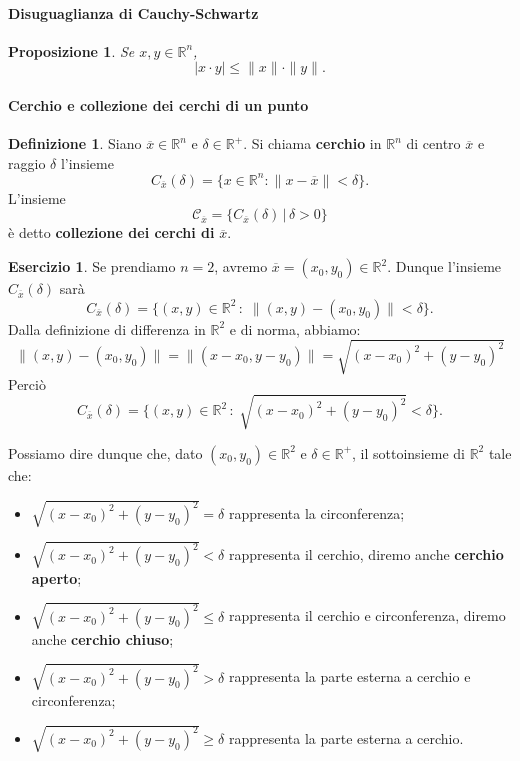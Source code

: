 \documentclass{article}
\theoremstyle{plain}
\newtheorem{prop}[thm]{Proposizione}
\theoremstyle{definition}
\newtheorem{defn}{Definizione}[section]
\newtheorem{xca}[exmp]{Esercizio}
\theoremstyle{remark}
\begin{document}
\vspace{10pt}

\paragraph{Disuguaglianza di Cauchy-Schwartz}
\begin{bxthm}
\begin{prop}
    Se $x,y\in\mathbb{R}^n$, \[|x\cdot y|\leq \|x\|\cdot\|y\|.\]
\end{prop}
\end{bxthm}

\vspace{10pt}


\paragraph{Cerchio e collezione dei cerchi di un punto}
\begin{bxthm}
\begin{defn}
    Siano $\overline{x}\in\mathbb{R}^n$ e $\delta\in\mathbb{R}^+$. 
    Si chiama \textbf{cerchio} in $\mathbb{R}^n$ di centro $\overline{x}$ e raggio $\delta$ l'insieme 
    \[C_{\overline{x}}(\delta)=\{x\in\mathbb{R}^n:\|x-\overline{x}\|<\delta\}.\]
    L'insieme \[\mathcal{C}_{\overline{x}}=\{C_{\overline{x}}(\delta) \,|\, \delta>0\}\] è detto \textbf{collezione dei cerchi di} $\overline{x}$.
\end{defn}
\end{bxthm}

\vspace{10pt}

\begin{xca}
    Se prendiamo $n=2$, avremo $\overline{x}=(x_0,y_0)\in\mathbb{R}^2$. 
    Dunque l'insieme $C_{\overline{x}}(\delta)$ sarà
    \[C_{\overline{x}}(\delta)=\{(x,y)\in\mathbb{R}^2\,:\;\|(x,y)-(x_0,y_0)\|<\delta\}.\]
    Dalla definizione di differenza in $\mathbb{R}^2$ e di norma, abbiamo:
    \[\|(x,y)-(x_0,y_0)\|=\|(x-x_0,y-y_0)\|=\sqrt{(x-x_0)^2+(y-y_0)^2}\]
    Perciò
    \[C_{\overline{x}}(\delta)=\{(x,y)\in\mathbb{R}^2\,:\;\sqrt{(x-x_0)^2+(y-y_0)^2}<\delta\}.\]

    Possiamo dire dunque che, dato $(x_0,y_0)\in\mathbb{R}^2$ e $\delta\in\mathbb{R}^+$, il sottoinsieme di $\mathbb{R}^2$ tale che:
    \begin{itemize}
        \item $\sqrt{(x-x_0)^2+(y-y_0)^2}=\delta$ rappresenta la circonferenza;
        \item $\sqrt{(x-x_0)^2+(y-y_0)^2}<\delta$ rappresenta il cerchio, diremo anche \textbf{cerchio aperto};
        \item $\sqrt{(x-x_0)^2+(y-y_0)^2}\leq \delta$ rappresenta il cerchio e circonferenza, diremo anche \textbf{cerchio chiuso};
        \item $\sqrt{(x-x_0)^2+(y-y_0)^2}> \delta$ rappresenta la parte esterna a cerchio e circonferenza;
        \item $\sqrt{(x-x_0)^2+(y-y_0)^2}\geq \delta$ rappresenta la parte esterna a cerchio.
    \end{itemize}
\end{xca}
\end{document}
